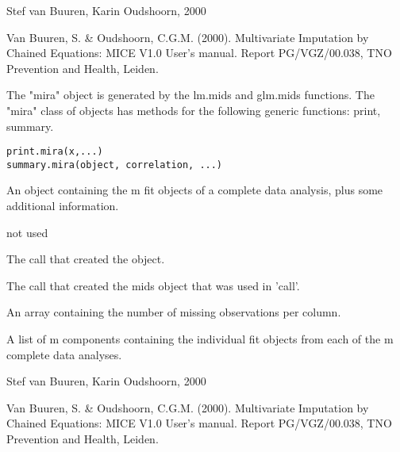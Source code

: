 \documentclass{article}
\begin{document}
\begin{Author}\relax
Stef van Buuren, Karin Oudshoorn, 2000
\end{Author}
\begin{References}\relax
Van Buuren, S. \& Oudshoorn, C.G.M. (2000). Multivariate Imputation by Chained Equations: 
MICE V1.0 User's manual. Report PG/VGZ/00.038, TNO Prevention and Health, Leiden.
\end{References}

\begin{Description}\relax
The "mira" object is generated by the lm.mids and glm.mids functions.
The "mira" class of objects has methods for the following generic functions:
print, summary.
\end{Description}
\begin{Usage}
\begin{verbatim}
print.mira(x,...)
summary.mira(object, correlation, ...)
\end{verbatim}
\end{Usage}
\begin{Arguments}
\begin{ldescription}
\item[\code{x, object}] An object containing the m fit objects of a complete data analysis, 
plus some additional information.
\item[\code{correlation}] 
\item[\code{...}] not used
\end{ldescription}
\end{Arguments}
\begin{Value}
\begin{ldescription}
\item[\code{call}] The call that created the object.
\item[\code{call1}] The call that created the mids object that was used in 'call'.
\item[\code{nmis}] An array containing the number of missing observations per column.
\item[\code{analyses}] A list of m components containing the individual fit objects from each of the m complete data analyses.
\end{ldescription}
\end{Value}
\begin{Author}\relax
Stef van Buuren, Karin Oudshoorn, 2000
\end{Author}
\begin{References}\relax
Van Buuren, S. \& Oudshoorn, C.G.M. (2000). Multivariate Imputation by Chained Equations: 
MICE V1.0 User's manual. Report PG/VGZ/00.038, TNO Prevention and Health, Leiden.
\end{References}
\end{document}
